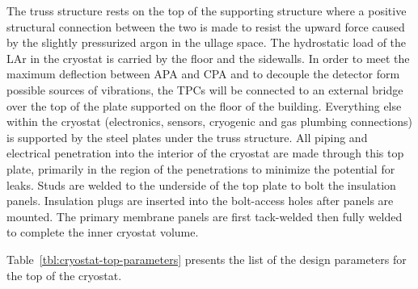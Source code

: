 The truss structure rests on the top of the supporting structure where a positive structural connection 
between the two is made to resist the upward force caused by the slightly pressurized argon in the ullage 
space. The hydrostatic load of the LAr in the cryostat is carried by the floor and the sidewalls. In order to meet the maximum deflection between APA and CPA and to decouple the detector form possible sources of vibrations, the TPCs will be connected to an external bridge over the top of the plate supported on the floor of the building. Everything else within the cryostat %
(electronics, sensors, cryogenic and gas plumbing connections) is 
supported by the steel plates under the truss structure. All piping and electrical penetration into the 
interior of the cryostat are made through this top plate, primarily in the region of the penetrations to 
minimize the potential for leaks. Studs are welded to the underside of the top plate to bolt the insulation 
panels. Insulation plugs are inserted into the bolt-access holes after panels are mounted. The primary 
membrane panels are first tack-welded then fully welded to complete the inner cryostat volume.


Table~\ref{tbl:cryostat-top-parameters} presents the list of the design parameters for the top of the cryostat.

